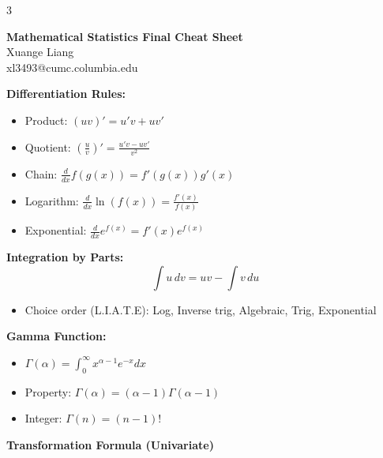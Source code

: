 \documentclass[10pt,letterpaper]{article}
\begin{document}
\raggedright
\footnotesize
{}
\begin{multicols}{3}

\setlength{\premulticols}{1pt}
\setlength{\postmulticols}{1pt}
\setlength{\multicolsep}{1pt}
\setlength{\columnsep}{2pt}

\begin{center}
\LARGE{\textbf{Mathematical Statistics Final Cheat Sheet}} \\[0.5em]
\small{Xuange Liang\\xl3493@cumc.columbia.edu}
\end{center}

\vspace{2mm}
\vspace{0.5mm}

\textbf{Differentiation Rules:}
\begin{itemize}
\item Product: $(uv)' = u'v + uv'$
\item Quotient: $(\frac{u}{v})' = \frac{u'v - uv'}{v^2}$
\item Chain: $\frac{d}{dx}f(g(x)) = f'(g(x))g'(x)$
\item Logarithm: $\frac{d}{dx}\ln(f(x)) = \frac{f'(x)}{f(x)}$
\item Exponential: $\frac{d}{dx}e^{f(x)} = f'(x)e^{f(x)}$
\end{itemize}

\textbf{Integration by Parts:}
$$\int u \, dv = uv - \int v \, du$$
\begin{itemize}
\item Choice order (L.I.A.T.E): Log, Inverse trig, Algebraic, Trig, Exponential
\end{itemize}

\textbf{Gamma Function:}
\begin{itemize}
\item $\Gamma(\alpha) = \int_0^\infty x^{\alpha-1}e^{-x} dx$
\item Property: $\Gamma(\alpha) = (\alpha-1)\Gamma(\alpha-1)$
\item Integer: $\Gamma(n) = (n-1)!$
\end{itemize}

\vspace{2mm}
\vspace{0.5mm}

\textbf{Transformation Formula (Univariate)}


\end{multicols}
\end{document}
